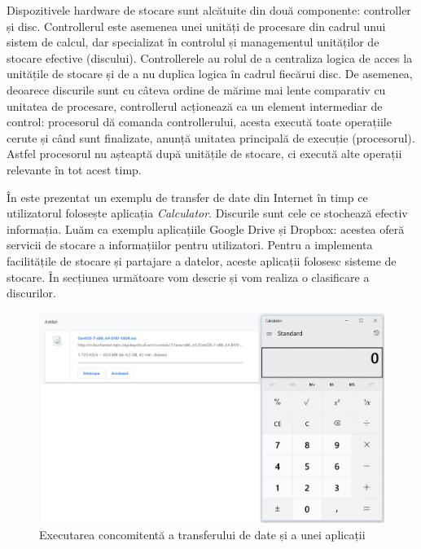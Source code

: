 Dispozitivele hardware de stocare sunt alcătuite
din două componente: controller și disc. Controllerul este asemenea unei
unități de procesare din cadrul unui sistem de calcul, dar specializat în
controlul și managementul unităților de stocare efective (discului). Controllerele au
rolul de a centraliza logica de acces la unitățile de stocare și de a nu duplica
logica în cadrul fiecărui disc. De asemenea, deoarece discurile sunt cu câteva
ordine de mărime mai lente comparativ cu unitatea de procesare, controllerul
acționează ca un element intermediar de control: procesorul dă comanda
controllerului, acesta execută toate operațiile cerute și când sunt finalizate,
anunță unitatea principală de execuție (procesorul). Astfel procesorul nu
așteaptă după unitățile de stocare, ci execută alte operații relevante în tot
acest timp.

În  este prezentat un
exemplu de transfer de date din Internet în timp ce
utilizatorul folosește aplicația \textit{Calculator}. Discurile sunt cele ce
stochează efectiv informația. Luăm ca exemplu aplicațiile Google Drive și
Dropbox: acestea oferă servicii de stocare a informațiilor pentru utilizatori.
Pentru a implementa facilitățile de stocare și partajare a datelor, aceste
aplicații folosesc sisteme de stocare. În secțiunea următoare vom descrie și vom
realiza o clasificare a discurilor.

\begin{figure}[!htbp]
  \centering
  \includegraphics[width=15cm]{chapters/10-storage/img/concurrent-img.png}
  \caption{Executarea concomitentă a transferului de date și a unei aplicații}
  \label{fig:storage:concurrent-access}
\end{figure}

